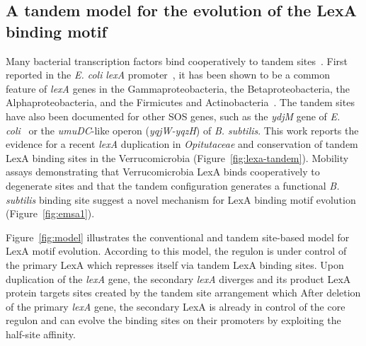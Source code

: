 \subsection{A tandem model for the evolution of the LexA binding motif}

Many bacterial transcription factors bind cooperatively to tandem
sites~\citep{barnard2004regulation}. First reported in the \textit{E. coli}
\textit{lexA} promoter~\citep{brent1982regulation}, it has been shown to be a
common feature of \textit{lexA} genes in the Gammaproteobacteria, the
Betaproteobacteria, the Alphaproteobacteria, and the Firmicutes and
Actinobacteria~\citep{sanchez2012analysis, cornish2012inference}. The tandem
sites have also been documented for other SOS genes, such as the \textit{ydjM}
gene of \textit{E. coli}~\citep{fernandez2000identification} or the
\textit{umuDC}-like operon (\textit{yqjW-yqzH}) of
\textit{B. subtilis}\citep{au2005genetic}. This work reports the evidence for a
recent \textit{lexA} duplication in \textit{Opitutaceae} and conservation of
tandem LexA binding sites in the Verrucomicrobia
(Figure~\ref{fig:lexa-tandem}). Mobility assays demonstrating that
Verrucomicrobia LexA binds cooperatively to degenerate sites and that the
tandem configuration generates a functional \textit{B. subtilis} binding site
suggest a novel mechanism for LexA binding motif evolution
(Figure~\ref{fig:emsa1}).

Figure~\ref{fig:model} illustrates the conventional and tandem site-based model
for LexA motif evolution. According to this model, the regulon is under control
of the primary LexA which represses itself via tandem LexA binding sites. Upon
duplication of the \textit{lexA} gene, the secondary \textit{lexA} diverges and
its product LexA protein targets sites created by the tandem site arrangement
which After deletion of the primary \textit{lexA} gene, the secondary LexA is
already in control of the core regulon and can evolve the binding sites on
their promoters by exploiting the half-site affinity.

